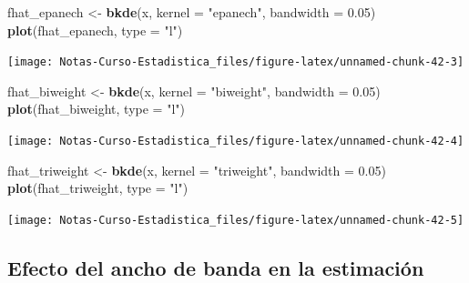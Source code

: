 \documentclass[
  12pt,
]{book}
\newenvironment{Shaded}{\begin{snugshade}}{\end{snugshade}}
\newcommand{\DataTypeTok}[1]{\textcolor[rgb]{0.13,0.29,0.53}{#1}}
\newcommand{\FloatTok}[1]{\textcolor[rgb]{0.00,0.00,0.81}{#1}}
\newcommand{\KeywordTok}[1]{\textcolor[rgb]{0.13,0.29,0.53}{\textbf{#1}}}
\newcommand{\NormalTok}[1]{#1}
\newcommand{\StringTok}[1]{\textcolor[rgb]{0.31,0.60,0.02}{#1}}
\theoremstyle{definition}
\theoremstyle{definition}
\theoremstyle{definition}
\theoremstyle{remark}
\begin{document}
\begin{Shaded}
\begin{Highlighting}[]
\NormalTok{fhat_epanech <-}\StringTok{ }\KeywordTok{bkde}\NormalTok{(x, }\DataTypeTok{kernel =} \StringTok{"epanech"}\NormalTok{, }\DataTypeTok{bandwidth =} \FloatTok{0.05}\NormalTok{)}
\KeywordTok{plot}\NormalTok{(fhat_epanech, }\DataTypeTok{type =} \StringTok{"l"}\NormalTok{)}
\end{Highlighting}
\end{Shaded}

\begin{center}\texttt{[image: Notas-Curso-Estadistica\_files/figure-latex/unnamed-chunk-42-3]} \end{center}

\begin{Shaded}
\begin{Highlighting}[]
\NormalTok{fhat_biweight <-}\StringTok{ }\KeywordTok{bkde}\NormalTok{(x, }\DataTypeTok{kernel =} \StringTok{"biweight"}\NormalTok{, }\DataTypeTok{bandwidth =} \FloatTok{0.05}\NormalTok{)}
\KeywordTok{plot}\NormalTok{(fhat_biweight, }\DataTypeTok{type =} \StringTok{"l"}\NormalTok{)}
\end{Highlighting}
\end{Shaded}

\begin{center}\texttt{[image: Notas-Curso-Estadistica\_files/figure-latex/unnamed-chunk-42-4]} \end{center}

\begin{Shaded}
\begin{Highlighting}[]
\NormalTok{fhat_triweight <-}\StringTok{ }\KeywordTok{bkde}\NormalTok{(x, }\DataTypeTok{kernel =} \StringTok{"triweight"}\NormalTok{, }\DataTypeTok{bandwidth =} \FloatTok{0.05}\NormalTok{)}
\KeywordTok{plot}\NormalTok{(fhat_triweight, }\DataTypeTok{type =} \StringTok{"l"}\NormalTok{)}
\end{Highlighting}
\end{Shaded}

\begin{center}\texttt{[image: Notas-Curso-Estadistica\_files/figure-latex/unnamed-chunk-42-5]} \end{center}

\hypertarget{efecto-del-ancho-de-banda-en-la-estimaciuxf3n}{%
\subsection{Efecto del ancho de banda en la estimación}\label{efecto-del-ancho-de-banda-en-la-estimaciuxf3n}}
\end{document}
